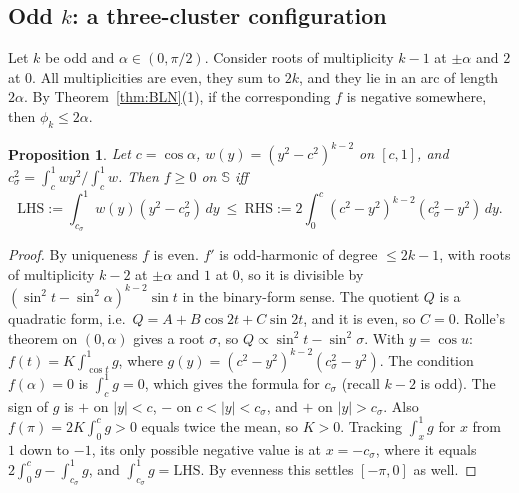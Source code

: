 \documentclass[11pt]{amsart}
\newtheorem{proposition}[theorem]{Proposition}
\theoremstyle{definition}
\newcommand{\Sph}{\mathbb{S}}
\begin{document}
\subsection*{Odd $k$: a three-cluster configuration}
Let $k$ be odd and $\alpha\in(0,\pi/2)$. Consider roots of multiplicity $k-1$ at $\pm\alpha$ and $2$ at $0$. All multiplicities are
even, they sum to $2k$, and they lie in an arc of length $2\alpha$. By Theorem~\ref{thm:BLN}(1), if the corresponding $f$ is negative
somewhere, then $\phi_k\le2\alpha$.

\begin{proposition}\label{prop:3cl}
Let $c=\cos\alpha$, $w(y)=(y^2-c^2)^{k-2}$ on $[c,1]$, and $c_\sigma^2=\int_c^1wy^2/\int_c^1w$. Then $f\ge0$ on $\Sph$ iff
\[
\mathrm{LHS}:=\int_{c_\sigma}^1w(y)(y^2-c_\sigma^2)\,dy\ \le\ \mathrm{RHS}:=2\int_0^c(c^2-y^2)^{k-2}(c_\sigma^2-y^2)\,dy .
\]
\end{proposition}
\begin{proof}
By uniqueness $f$ is even. $f'$ is odd-harmonic of degree $\le2k-1$, with roots of multiplicity $k-2$ at $\pm\alpha$ and $1$ at $0$, so it
is divisible by $(\sin^2t-\sin^2\alpha)^{k-2}\sin t$ in the binary-form sense. The quotient $Q$ is a quadratic form, i.e.\
$Q=A+B\cos2t+C\sin2t$, and it is even, so $C=0$. Rolle's theorem on $(0,\alpha)$ gives a root $\sigma$, so $Q\propto\sin^2t-\sin^2\sigma$.
With $y=\cos u$: $f(t)=K\int_{\cos t}^1g$, where $g(y)=(c^2-y^2)^{k-2}(c_\sigma^2-y^2)$. The condition $f(\alpha)=0$ is
$\int_c^1g=0$, which gives the formula for $c_\sigma$ (recall $k-2$ is odd). The sign of $g$ is $+$ on $|y|<c$, $-$ on $c<|y|<c_\sigma$,
and $+$ on $|y|>c_\sigma$. Also $f(\pi)=2K\int_0^cg>0$ equals twice the mean, so $K>0$. Tracking $\int_x^1g$ for $x$ from $1$ down to
$-1$, its only possible negative value is at $x=-c_\sigma$, where it equals $2\int_0^cg-\int_{c_\sigma}^1g$, and
$\int_{c_\sigma}^1g=\mathrm{LHS}$. By evenness this settles $[-\pi,0]$ as well.
\end{proof}
\end{document}
